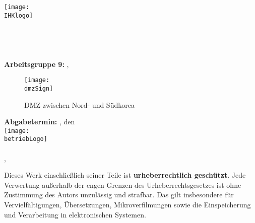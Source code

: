 \begin{titlepage}

\begin{center}
\texttt{[image: \\IHKlogo]}\\[0.5ex]
\Large{\ausbildungsberuf}\\
\LARGE{\betreff}\\[1.5ex]

\huge{\textbf{\titel}}\\[0.5ex]
\Large{\textbf{\untertitel}}\\[2ex]

\normalsize
\textbf{Arbeitsgruppe 9:} \autorNameTwo{}, \autorNameOne\\[4ex]

\begin{figure}[htb]
    \centering
    \texttt{[image: \\dmzSign]}\\[2ex]
    \caption{DMZ zwischen Nord- und Südkorea}
    \label{fig:DMZ_Korea}
\end{figure}

\textbf{Abgabetermin:} \abgabeOrt{}, den \abgabeTermin\\[1.5em]

\texttt{[image: \\betriebLogo]}\\
\betriebName{}\\
\betriebAnschrift{}, \betriebOrt\\[2em]
\end{center}

\small
\noindent
Dieses Werk einschließlich seiner Teile ist \textbf{urheberrechtlich geschützt}.
Jede Verwertung außerhalb der engen Grenzen des Urheberrechtsgesetzes ist ohne Zustimmung des Autors unzulässig und strafbar. 
Das gilt insbesondere für Vervielfältigungen, Übersetzungen, Mikroverfilmungen sowie die Einspeicherung und Verarbeitung in elektronischen Systemen.

\end{titlepage}